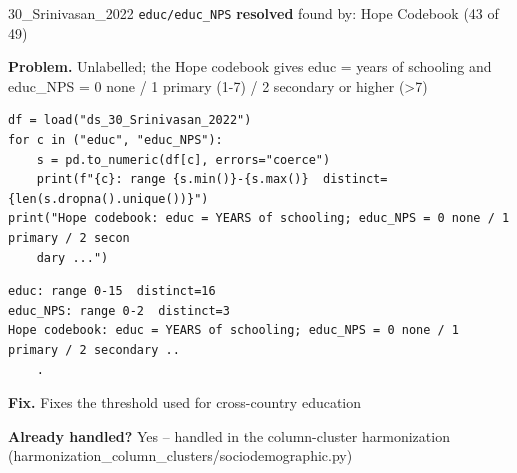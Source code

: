\documentclass[9pt, t, handout]{beamer}
\newcommand{\ans}[1]{\textcolor{structure.fg}{#1}}
\begin{document}
\begin{frame}[fragile]{30\_Srinivasan\_2022 \quad \texttt{educ/educ\_NPS}}
  {\scriptsize\textcolor{green!45!black}{\textbf{resolved}} \quad
   found by: Hope Codebook \quad (43 of 49)}
  \vspace{3pt}

  {\footnotesize \textbf{Problem.} Unlabelled; the Hope codebook gives educ = years of schooling and educ\_NPS = 0 none / 1 primary (1-7) / 2 secondary or higher (>7)}
  \vspace{4pt}

  \begin{Verbatim}[fontsize=\tiny, frame=single, framesep=2pt, label=\tiny reproduce]
df = load("ds_30_Srinivasan_2022")
for c in ("educ", "educ_NPS"):
    s = pd.to_numeric(df[c], errors="coerce")
    print(f"{c}: range {s.min()}-{s.max()}  distinct={len(s.dropna().unique())}")
print("Hope codebook: educ = YEARS of schooling; educ_NPS = 0 none / 1 primary / 2 secon
    dary ...")
  \end{Verbatim}
  \begin{Verbatim}[fontsize=\tiny, frame=single, framesep=2pt, label=\tiny output]
educ: range 0-15  distinct=16
educ_NPS: range 0-2  distinct=3
Hope codebook: educ = YEARS of schooling; educ_NPS = 0 none / 1 primary / 2 secondary ..
    .
  \end{Verbatim}
  \vspace{2pt}

  {\footnotesize \textbf{Fix.} Fixes the threshold used for cross-country education}
  \vspace{2pt}

  {\footnotesize \textbf{Already handled?} \ans{Yes} -- handled in the column-cluster harmonization
   (harmonization\_column\_clusters/sociodemographic.py)}
\end{frame}
\end{document}
